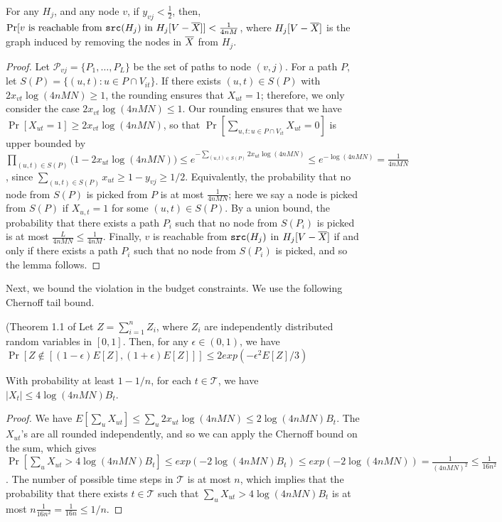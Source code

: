 \begin{lemma}
\label{lem:disconnect}
For any $H_j$, and any node $v$, if $y_{vj} < \frac{1}{2}$, then,
$\Pr[\mbox{$v$ is reachable from $\texttt{src}(H_j)$ in $H_j[V-\overline{X}]$}] < \frac{1}{4nM}$,
where $H_j[V-\overline{X}]$ is the graph induced by removing the nodes in $\overline{X}$ from $H_j$.
\end{lemma}
\begin{proof}
Let $\mathcal{P}_{vj} = \{P_1, \ldots,P_L\}$ be the  set of paths to node $(v,j)$. 
For a path $P$, let $S(P)=\{(u, t): u\in P\cap V_{it}\}$.
If there exists $(u, t)\in S(P)$ with $2 x_{vt} \log(4nMN) \geq 1$, the rounding ensures that $X_{ut}=1$;
therefore, we only consider the case $2 x_{vt} \log(4nMN)\leq 1$.
Our rounding ensures that we have $\Pr[X_{ut}=1] \geq 2 x_{vt} \log(4nMN)$, so that
$\Pr[\sum_{u, t: u\in P\cap V_{it}} X_{ut} = 0]$ is upper bounded by
$\prod_{(u,t) \in S(P)} \big(1- 2 x_{ut} \log(4nMN)\big) \leq e^{-\sum_{(u, t)\in S(P)} 2 x_{ut} \log(4nMN)}
\leq e^{-\log(4nMN)}= \frac{1}{4nMN}$,
since $\sum_{(u, t)\in S(P)} x_{ut} \geq 1-y_{vj} \geq 1/2$.
Equivalently, the probability that no node from $S(P)$ is picked from $P$ is at most $\frac{1}{4nMN}$;
here we say a node is picked from $S(P)$ if $X_{u,t}=1$ for some $(u, t)\in S(P)$.
By a union bound, the probability that there exists a path $P_i$ such that no node from
$S(P_i)$ is picked is at most $\frac{L}{4nMN}\leq \frac{1}{4nM}$.
Finally, $v$ is reachable from $\texttt{src}(H_j)$ in $H_j[V-\overline{X}]$ if and only if there exists a path $P_i$ such that no node from
$S(P_i)$ is picked, and so the lemma follows.
\end{proof}

Next, we bound the violation in the budget constraints. We use the following Chernoff tail bound.

\begin{theorem} (Theorem 1.1 of \cite{books/daglib/0025902}
Let $Z=\sum_{i=1}^n Z_i$, where $Z_i$ are independently distributed random variables in $[0, 1]$. Then, for any $\epsilon\in(0, 1)$, we have
$\Pr[Z\not\in[(1-\epsilon)E[Z], (1+\epsilon)E[Z]]]\leq 2 exp(-\epsilon^2 E[Z]/3)$


\end{theorem}

\noindent
\begin{lemma}
\label{lem:budget}
With probability at least $1-1/n$, for each $t\in \mathcal{T}$, we have
$|X_t|\leq 4\log(4nMN)B_t$.
\end{lemma}
\begin{proof}
We have $E[\sum_u X_{ut}]\leq \sum_u 2x_{ut}\log(4nMN) \leq 2\log(4nMN)B_t$.
The $X_{ut}$'s are all rounded independently, and so we can apply the Chernoff bound on the sum, which gives
$\Pr[\sum_u X_{ut} > 4\log(4nMN)B_t] \leq exp(-2\log(4nMN)B_t) \leq exp(-2\log(4nMN))= \frac{1}{(4nMN)^2}\leq \frac{1}{16n^2}$.
The number of possible time steps in $\mathcal{T}$ is at most $n$, which implies that the probability that there exists 
$t\in\mathcal{T}$ such that $\sum_u X_{ut} > 4\log(4nMN)B_t$ is at most $n\frac{1}{16n^2}=\frac{1}{16n}\leq 1/n$.
\end{proof}

